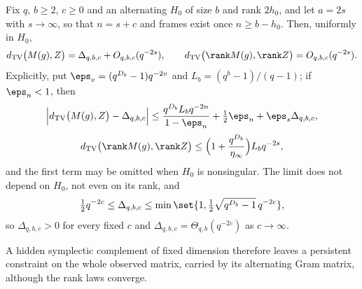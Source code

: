 \begin{theorem}\label{spn:thm:complement-boundary}
Fix $q$, $b\ge2$, $c\ge0$ and an alternating $H_0$ of size $b$ and rank $2h_0$, and let
$a=2s$ with $s\to\infty$, so that $n=s+c$ and frames exist once $n\ge b-h_0$. Then, uniformly
in $H_0$,
\[
 \spnTV\bigl(M(g),Z\bigr)=\Delta_{q,b,c}+O_{q,b,c}(q^{-2s}),\qquad
 \spnTV\bigl(\rank M(g),\rank Z\bigr)=O_{q,b,c}(q^{-2s}).
\]
Explicitly, put $\eps_v=(q^{D_b}-1)q^{-2v}$ and $L_b=(q^b-1)/(q-1)$; if $\eps_n<1$, then
\[
 \Bigl|\spnTV\bigl(M(g),Z\bigr)-\Delta_{q,b,c}\Bigr|
 \le\frac{q^{D_b}L_bq^{-2n}}{1-\eps_n}+\tfrac12\eps_n+\eps_s\Delta_{q,b,c},
\]
\[
 \spnTV\bigl(\rank M(g),\rank Z\bigr)\le\Bigl(1+\frac{q^{D_b}}{\eta_\infty}\Bigr)L_bq^{-2s},
\]
and the first term may be omitted when $H_0$ is nonsingular. The limit does not depend on
$H_0$, not even on its rank, and
\[
 \tfrac12q^{-2c}\le\Delta_{q,b,c}\le\min\set{1,\tfrac12\sqrt{q^{D_b}-1}\,q^{-2c}} ,
\]
so $\Delta_{q,b,c}>0$ for every fixed $c$ and $\Delta_{q,b,c}=\Theta_{q,b}(q^{-2c})$ as
$c\to\infty$.
\end{theorem}

A hidden symplectic complement of fixed dimension therefore leaves a persistent constraint on
the whole observed matrix, carried by its alternating Gram matrix, although the rank laws
converge.

